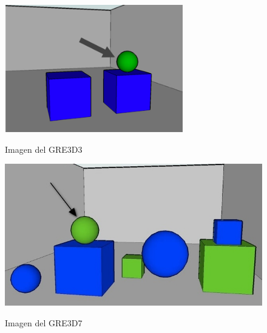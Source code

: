\begin{figure}
\centering
\includegraphics[width=\textwidth]{images/GRE3D3.png}\\[0pt]
\caption{Imagen del GRE3D3}
\label{fig-GRE3D3}
\end{figure}
\begin{figure}
\centering
\includegraphics[width=\textwidth]{images/3.jpg}\\[0pt]
\caption{Imagen del GRE3D7}
\label{fig-GRE3D7}
\end{figure}


